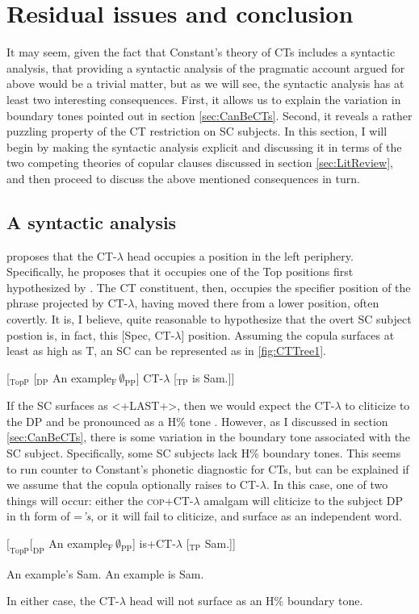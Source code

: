 \documentclass[
	letterpaper,
]{article}
\begin{document}
\section{Residual issues and conclusion}\label{sec:Conclusion}
It may seem, given the fact that Constant's theory of CTs includes a syntactic analysis, that providing a syntactic analysis of the pragmatic account argued for above would be a trivial matter, but as we will see, the syntactic analysis has at least two interesting consequences.
First, it allows us to explain the variation in boundary tones pointed out in section \ref{sec:CanBeCTs}.
Second, it reveals a rather puzzling property of the CT restriction on SC subjects.
In this section, I will begin by making the syntactic analysis explicit and discussing it in terms of the two competing theories of copular clauses discussed in section \ref{sec:LitReview}, and then proceed to discuss the above mentioned consequences in turn.

\subsection{A syntactic analysis}
\textcite[124]{constant2014diss} proposes that the CT-$\lambda$ head occupies a position in the left periphery.
Specifically, he proposes that it occupies one of the Top positions first hypothesized by \textcite{rizzi1997fine}.
The CT constituent, then, occupies the specifier position of the phrase projected by CT-$\lambda$, having moved there from a lower position, often covertly.
It is, I believe, quite reasonable to hypothesize that the overt SC subject postion is, in fact, this [Spec, CT-$\lambda$] position.
Assuming the copula surfaces at least as high as T, an SC can be represented as in \ref{fig:CTTree1}.
\begin{exe}
\ex\label{fig:CTTree1} [$_\text{TopP}$ [$_\text{DP}$ An example$_\text{F}\,\emptyset_\text{PP}$] CT-$\lambda$ [$_\text{TP}$ is Sam.]]	
\end{exe}
If the SC surfaces as <+LAST+>, then we would expect the CT-$\lambda$ to cliticize to the DP and be pronounced as a H\% tone \parencite[following][]{constant2014diss}.
However, as I discussed in section \ref{sec:CanBeCTs}, there is some variation in the boundary tone associated with the SC subject.
Specifically, some SC subjects lack H\% boundary tones.
This seems to run counter to Constant's phonetic diagnostic for CTs, but can be explained if we assume that the copula optionally raises to CT-$\lambda$.
In this case, one of two things will occur: either the \textsc{cop}+CT-$\lambda$ amalgam will cliticize to the subject DP in th form of =\textit{'s}, or it will fail to cliticize, and surface as an independent word.
\begin{exe}
\ex $[_\text{TopP} [_\text{DP}$ An example$_\text{F}\,\emptyset_\text{PP}$] is+CT-$\lambda$ [$_\text{TP}$ Sam.]]
	\begin{xlist}
		\ex An example's Sam.
		\ex An example is Sam.
	\end{xlist}	
\end{exe}
In either case, the CT-$\lambda$ head will not surface as an H\% boundary tone.
\end{document}
